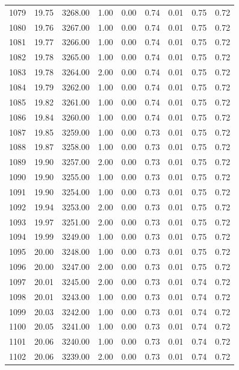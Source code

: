 \documentclass{article}\usepackage[]{graphicx}\usepackage[]{color}
\begin{document}
\begin{longtable}{rrrrrrrrr}
  1079 & 19.75 & 3268.00 & 1.00 & 0.00 & 0.74 & 0.01 & 0.75 & 0.72 \\ 
  1080 & 19.76 & 3267.00 & 1.00 & 0.00 & 0.74 & 0.01 & 0.75 & 0.72 \\ 
  1081 & 19.77 & 3266.00 & 1.00 & 0.00 & 0.74 & 0.01 & 0.75 & 0.72 \\ 
  1082 & 19.78 & 3265.00 & 1.00 & 0.00 & 0.74 & 0.01 & 0.75 & 0.72 \\ 
  1083 & 19.78 & 3264.00 & 2.00 & 0.00 & 0.74 & 0.01 & 0.75 & 0.72 \\ 
  1084 & 19.79 & 3262.00 & 1.00 & 0.00 & 0.74 & 0.01 & 0.75 & 0.72 \\ 
  1085 & 19.82 & 3261.00 & 1.00 & 0.00 & 0.74 & 0.01 & 0.75 & 0.72 \\ 
  1086 & 19.84 & 3260.00 & 1.00 & 0.00 & 0.74 & 0.01 & 0.75 & 0.72 \\ 
  1087 & 19.85 & 3259.00 & 1.00 & 0.00 & 0.73 & 0.01 & 0.75 & 0.72 \\ 
  1088 & 19.87 & 3258.00 & 1.00 & 0.00 & 0.73 & 0.01 & 0.75 & 0.72 \\ 
  1089 & 19.90 & 3257.00 & 2.00 & 0.00 & 0.73 & 0.01 & 0.75 & 0.72 \\ 
  1090 & 19.90 & 3255.00 & 1.00 & 0.00 & 0.73 & 0.01 & 0.75 & 0.72 \\ 
  1091 & 19.90 & 3254.00 & 1.00 & 0.00 & 0.73 & 0.01 & 0.75 & 0.72 \\ 
  1092 & 19.94 & 3253.00 & 2.00 & 0.00 & 0.73 & 0.01 & 0.75 & 0.72 \\ 
  1093 & 19.97 & 3251.00 & 2.00 & 0.00 & 0.73 & 0.01 & 0.75 & 0.72 \\ 
  1094 & 19.99 & 3249.00 & 1.00 & 0.00 & 0.73 & 0.01 & 0.75 & 0.72 \\ 
  1095 & 20.00 & 3248.00 & 1.00 & 0.00 & 0.73 & 0.01 & 0.75 & 0.72 \\ 
  1096 & 20.00 & 3247.00 & 2.00 & 0.00 & 0.73 & 0.01 & 0.75 & 0.72 \\ 
  1097 & 20.01 & 3245.00 & 2.00 & 0.00 & 0.73 & 0.01 & 0.74 & 0.72 \\ 
  1098 & 20.01 & 3243.00 & 1.00 & 0.00 & 0.73 & 0.01 & 0.74 & 0.72 \\ 
  1099 & 20.03 & 3242.00 & 1.00 & 0.00 & 0.73 & 0.01 & 0.74 & 0.72 \\ 
  1100 & 20.05 & 3241.00 & 1.00 & 0.00 & 0.73 & 0.01 & 0.74 & 0.72 \\ 
  1101 & 20.06 & 3240.00 & 1.00 & 0.00 & 0.73 & 0.01 & 0.74 & 0.72 \\ 
  1102 & 20.06 & 3239.00 & 2.00 & 0.00 & 0.73 & 0.01 & 0.74 & 0.72 \\ 

\end{longtable}
\end{document}
